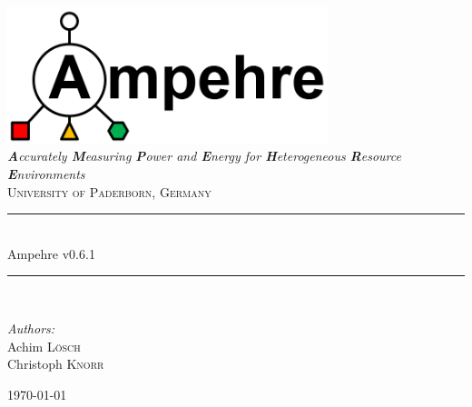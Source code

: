 %
%
%
%
%
%

\begin{titlepage}

\begin{center}

\includegraphics[width=0.7\textwidth]{figures/ampehre_logo.png}\\[1cm]

\textit{\LARGE \textbf{A}ccurately \textbf{M}easuring \textbf{P}ower and \textbf{E}nergy for \textbf{H}eterogeneous \textbf{R}esource \textbf{E}nvironments}\\[1cm]

\textsc{\Large University of Paderborn, Germany}\\[1cm]

\newcommand{\HRule}{\rule{\linewidth}{0.5mm}} \HRule \\[0.6cm] { \huge Ampehre v0.6.1}\\[0.4cm]

\HRule\\[1cm]

\begin{minipage}{0.4\textwidth} \begin{center} \large \emph{Authors:}\\ Achim \textsc{L\"osch}\\Christoph \textsc{Knorr} \end{center} \end{minipage}

\vfill

{\Large \today}

\end{center}

\end{titlepage}

\tableofcontents
